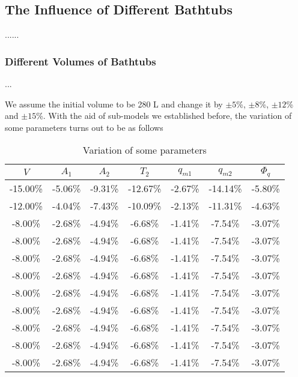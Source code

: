 \documentclass{mcmthesis}
\begin{document}
\subsection{The Influence of Different Bathtubs}
    
......
    
\subsubsection{Different Volumes of Bathtubs}
    
...

We assume the initial volume to be 280 L and change it by $\pm 5$\%, $\pm 8$\%, 
$\pm 12$\% and $\pm 15$\%. With the aid of sub-models we established before, the 
variation of some parameters turns out to be as follows

\begin{table}[h] %
\centering  %
\caption{Variation of some parameters}  %
\label{tab7} %
\begin{tabular}{ccccccc} %
\toprule  %
$V$      & $A_1$   & $A_2$   & $T_2$    & $q_{m1}$ & $q_{m2}$ & $\Phi_q$ \\     %
\midrule  %
-15.00\% & -5.06\% & -9.31\% & -12.67\% & -2.67\%  & -14.14\% & -5.80\% \\
-12.00\% & -4.04\% & -7.43\% & -10.09\% & -2.13\%  & -11.31\% & -4.63\% \\
-8.00\%  & -2.68\% & -4.94\% & -6.68\%  & -1.41\%  & -7.54\%  & -3.07\% \\
-8.00\%  & -2.68\% & -4.94\% & -6.68\%  & -1.41\%  & -7.54\%  & -3.07\% \\
-8.00\%  & -2.68\% & -4.94\% & -6.68\%  & -1.41\%  & -7.54\%  & -3.07\% \\
-8.00\%  & -2.68\% & -4.94\% & -6.68\%  & -1.41\%  & -7.54\%  & -3.07\% \\
-8.00\%  & -2.68\% & -4.94\% & -6.68\%  & -1.41\%  & -7.54\%  & -3.07\% \\
-8.00\%  & -2.68\% & -4.94\% & -6.68\%  & -1.41\%  & -7.54\%  & -3.07\% \\
-8.00\%  & -2.68\% & -4.94\% & -6.68\%  & -1.41\%  & -7.54\%  & -3.07\% \\
-8.00\%  & -2.68\% & -4.94\% & -6.68\%  & -1.41\%  & -7.54\%  & -3.07\% \\
-8.00\%  & -2.68\% & -4.94\% & -6.68\%  & -1.41\%  & -7.54\%  & -3.07\% \\
\bottomrule  %
\end{tabular}
\end{table}
\end{document}
